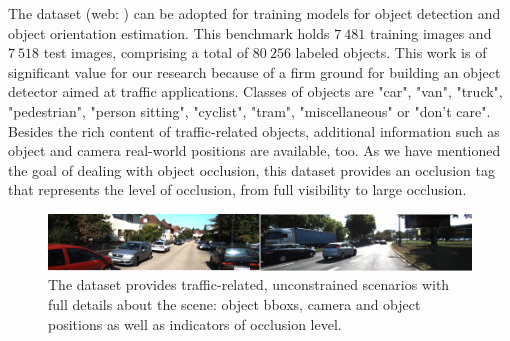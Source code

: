 The  dataset \cite{Geiger2012CVPR} (web: \cite{kittiobjectdetectiondataset}) can be adopted for training models for object detection and object orientation estimation. This benchmark holds $7\ 481$ training images and $7\ 518$ test images, comprising a total of $80\ 256$ labeled objects. This work is of significant value for our research because of a firm ground for building an object detector aimed at traffic applications. Classes of objects are "car", "van", "truck", "pedestrian", "person sitting", "cyclist", "tram", "miscellaneous" or "don't care". Besides the rich content of traffic-related objects, additional information such as object and camera real-world positions are available, too. As we have mentioned the goal of dealing with object occlusion, this dataset provides an occlusion tag that represents the level of occlusion, from full visibility to large occlusion.

\begin{figure}[t]
    \centerline{\includegraphics[width=0.9\linewidth]{figures/datasets/kitti_detection_sample.pdf}}
    \caption[ dataset]{The  dataset provides traffic-related, unconstrained scenarios with full details about the scene: object \glspl{bbox}, camera and object positions as well as indicators of occlusion level. }
    \label{fig:DatasetKITTIDetection}
\end{figure}
